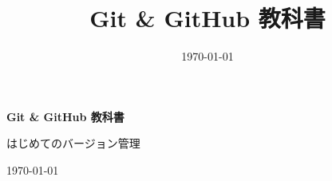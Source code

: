 \documentclass[book, paper=a4, fontsize=10.5pt, titlepage]{jlreq}
\title{Git \& GitHub 教科書}
\author{}          %
\date{\today}
\begin{document}
\begin{titlepage}
  \centering
  \vspace*{4cm}
  {\sffamily\bfseries\Huge Git \& GitHub 教科書\par}
  \vspace{1.2cm}
  {\sffamily\Large はじめてのバージョン管理\par}
  \vfill
  {\large \today\par}
\end{titlepage}

\tableofcontents
\clearpage






\end{document}
